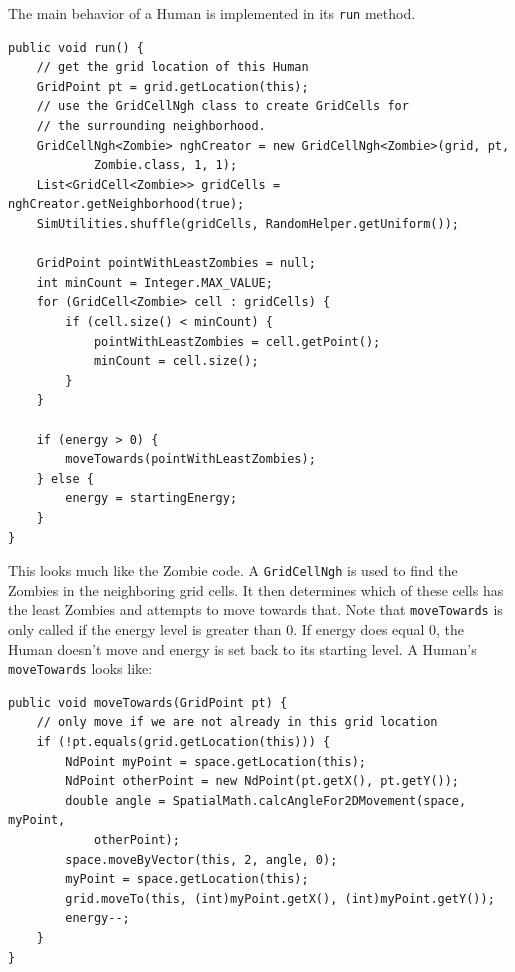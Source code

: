 \documentclass[11pt]{amsart}
\begin{document}
The main behavior of a Human is implemented in its \texttt{run} method.

\noindent\begin{minipage}[h]{\textwidth}
\vspace{.2in}
\lstset{language=java,caption=The Run Method}
\begin{lstlisting}
public void run() {
	// get the grid location of this Human
	GridPoint pt = grid.getLocation(this);
	// use the GridCellNgh class to create GridCells for
	// the surrounding neighborhood.
	GridCellNgh<Zombie> nghCreator = new GridCellNgh<Zombie>(grid, pt,
			Zombie.class, 1, 1);
	List<GridCell<Zombie>> gridCells = nghCreator.getNeighborhood(true);
	SimUtilities.shuffle(gridCells, RandomHelper.getUniform());

	GridPoint pointWithLeastZombies = null;
	int minCount = Integer.MAX_VALUE;
	for (GridCell<Zombie> cell : gridCells) {
		if (cell.size() < minCount) {
			pointWithLeastZombies = cell.getPoint();
			minCount = cell.size();
		}
	}
	
	if (energy > 0) {
		moveTowards(pointWithLeastZombies);
	} else {
		energy = startingEnergy;
	}
}
\end{lstlisting}
\vspace{.2in}
\end{minipage}

This looks much like the Zombie code. A \texttt{GridCellNgh} is used to find the Zombies in the neighboring grid cells. It then determines which of these cells has the least Zombies and attempts to move towards that. Note that \texttt{moveTowards} is only called if the energy level is greater than 0. If energy does equal 0, the Human doesn't move and energy is set back to its starting level. A Human's \texttt{moveTowards} looks like:

\noindent\begin{minipage}[h]{\textwidth}
\vspace{.2in}
\lstset{language=java,caption=}
\begin{lstlisting}
public void moveTowards(GridPoint pt) {
	// only move if we are not already in this grid location
	if (!pt.equals(grid.getLocation(this))) {
		NdPoint myPoint = space.getLocation(this);
		NdPoint otherPoint = new NdPoint(pt.getX(), pt.getY());
		double angle = SpatialMath.calcAngleFor2DMovement(space, myPoint, 
			otherPoint);
		space.moveByVector(this, 2, angle, 0);
		myPoint = space.getLocation(this);
		grid.moveTo(this, (int)myPoint.getX(), (int)myPoint.getY());
		energy--;
	}
}
\end{lstlisting}
\vspace{.2in}
\end{minipage}
\end{document}
